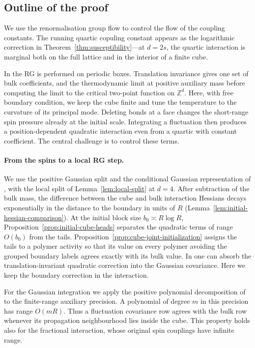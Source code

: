 \documentclass[11pt]{article}
\theoremstyle{definition}
\begin{document}
\subsection{Outline of the proof}

We use the renormalisation group flow to control the flow of the coupling constants.
The running quartic copuling constant appears as the logarithmic correction in Theorem~\ref{thm:susceptibility}---at \(d=2s\), 
the quartic interaction is marginal both on the full
lattice and in the interior of a finite cube. 

In \cite[Theorem~1 and Sections~7, 10 and~22]{IsingCorrelation}
the RG is performed on periodic boxes. Translation invariance gives
one set of bulk coefficients, and the thermodynamic limit at positive
auxiliary mass before computing the limit to the critical two-point function
on \(\mathbb Z^d\). Here, with free boundary condition,
we keep the cube finite and tune the temperature
to the curvature of its principal mode. Deleting bonds at a face
changes the short-range spin pressure already at the initial scale.
Integrating a fluctuation then produces a position-dependent quadratic
interaction even from a quartic with constant coefficient.
The central challenge is to control these terms.

\paragraph{From the spins to a local RG step.}
We use the positive Gaussian split and the conditional Gaussian
representation of \cite[Propositions~2.4 and~17.1]{IsingCorrelation},
with the local split of Lemma~\ref{lem:local-split} at \(d=4\).
After subtraction of the bulk mass, the difference between the cube
and bulk interaction Hessians decays exponentially in the distance to
the boundary in units of \(R\) (Lemma~\ref{lem:initial-hessian-comparison}).
At the initial block size
\(b_0\asymp R\log R\), Proposition~\ref{prop:initial-cube-heads}
separates the quadratic terms of range \(O(b_0)\) from the tails.
Proposition~\ref{prop:cube-joint-initialization} assigns the tails to
a polymer activity so that its value on every polymer avoiding the
grouped boundary labels agrees exactly with its bulk value. In
\cite[Sections~6--7 and~17--18]{IsingCorrelation} one can absorb the
translation-invariant quadratic correction into the Gaussian covariance.
Here we keep the boundary correction in the interaction.

For the Gaussian integration we apply the positive polynomial
decomposition of \cite[Lemma~2.1]{IsingCorrelation} to the finite-range
auxiliary precision. A polynomial of degree \(m\) in this precision
has range \(O(mR)\). Thus a fluctuation covariance row agrees with the
bulk row whenever its propagation neighbourhood lies inside the cube.
This property holds also for the fractional interaction, whose
original spin couplings have infinite range.
\end{document}
